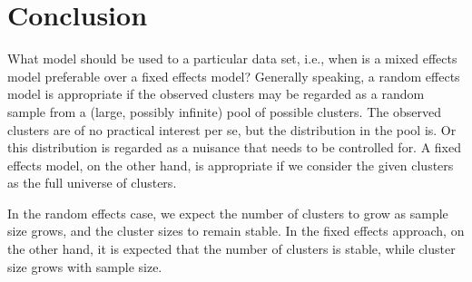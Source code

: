 \documentclass[a4paper,11pt]{article}
\begin{document}
\section{Conclusion}
What model should be used to a particular data set, i.e., when is a mixed
effects model preferable over a fixed effects model? 
Generally
speaking, a random effects model is appropriate if the observed clusters may be
regarded as a random sample from a (large, possibly infinite) pool of possible clusters. The
observed clusters are of no practical interest per se, but the distribution in the
pool is. Or this distribution is regarded as a nuisance that needs to be
controlled for. A fixed effects model, on the other hand, is appropriate if
we consider the given clusters as the full universe of clusters.

In the random effects case, we expect the number of clusters to grow as
sample size grows, and the cluster sizes to remain stable. In the fixed
effects approach, on the other hand, it is expected that the number of
clusters is stable, while cluster size grows with sample size.


%

\end{document}
